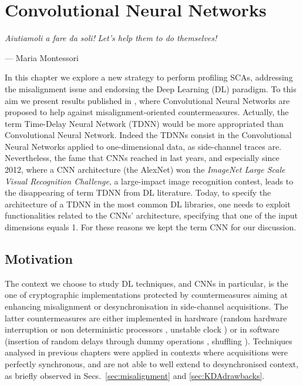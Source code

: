 
\chapter{Convolutional Neural Networks} %
\label{ChapterCNN}
\setlength{\epigraphwidth}{0.3\textwidth}

\epigraph{\textit{Aiutiamoli a fare da soli!}\newline
\footnotesize{\textit{Let's help them to do themselves!}}}{--- \textup{Maria Montessori}}


In this chapter we explore a new strategy to perform profiling SCAs, addressing the misalignment issue and endorsing the Deep Learning (DL) paradigm. To this aim we present results published in \cite{DBLP:conf/ches/CagliDP17}, where Convolutional Neural Networks are proposed to help against misalignment-oriented countermeasures. Actually, the term Time-Delay Neural Network (TDNN) would be more appropriated than Convolutional Neural Network. Indeed the TDNNs  \cite{lang1990time} consist in the Convolutional Neural Networks applied to one-dimensional data, as side-channel traces are. Nevertheless, the fame that CNNs reached in last years, and especially since 2012, where a CNN architecture (the \textquotedbl AlexNet\textquotedbl) \cite{KSH12}  won the \emph{ImageNet Large Scale Visual Recognition Challenge}, a large-impact image recognition contest, leads to the disappearing of term TDNN from DL literature. Today, to specify the architecture of a TDNN in the most common DL libraries, one needs to exploit functionalities related to the CNNs' architecture, specifying \eg that one of the input dimensions equals 1. For these reasons we kept the term CNN for our discussion. 

\section{Motivation}
The context we choose to study DL techniques, and CNNs in particular, is the one of cryptographic implementations protected by countermeasures aiming at enhancing misalignment or desynchronisation in side-channel acquisitions. The latter countermeasures are either implemented in hardware (random hardware interruption or non deterministic processors \cite{irwin2002instruction,may2001non}, unstable clock \cite{moore2002improving,moore2003balanced}) or in software (insertion of random delays through dummy operations \cite{coron2009efficient,coron2010analysis}, shuffling \cite{veyrat2012shuffling}). Techniques analysed in previous chapters were applied in contexts where acquisitions were perfectly synchronous, and are not able to well extend to desynchronised context, as briefly observed in Secs.~\ref{sec:misalignment} and \ref{sec:KDAdrawbacks}.\\

